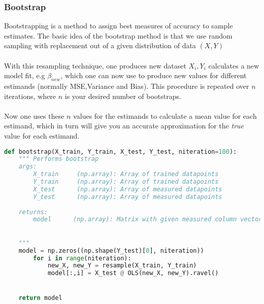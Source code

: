 \documentclass[../main.tex]{subfiles}
\begin{document}
\subsubsection{Bootstrap}\label{refmethod: bootstrap}
Bootstrapping is a method to assign best measures of accuracy to sample estimates. 
The basic idea of the bootstrap method is that we use random sampling with replacement out of a given distribution of data $(X,Y)$ %
\\ \\\indent With this resampling technique, one produces new dataset $X_i,Y_i$ calculates a new model fit, e.g $\beta_{new}$, which one can now use to produce new values for different estimands (normally MSE,Variance and Bias). This procedure is repeated over $n$  iterations, where $n$ is your desired number of bootstraps. \\ \\ Now one uses these $n$ values for the estimands to calculate a mean value for each estimand, which in turn will give you an accurate approximation for the \emph{true} value for each estimand.


\begin{lstlisting}[language=Python]
def bootstrap(X_train, Y_train, X_test, Y_test, niteration=100):
    """ Performs bootstrap
    args: 
        X_train     (np.array): Array of trained datapoints
        Y_train     (np.array): Array of trained datapoints
        X_test      (np.array): Array of measured datapoints
        Y_test      (np.array): Array of measured datapoints
    
    returns:
        model      (np.array): Matrix with given measured column vectors 
        

    """
    model = np.zeros((np.shape(Y_test)[0], niteration))
        for i in range(niteration):
            new_X, new_Y = resample(X_train, Y_train)
            model[:,i] = X_test @ OLS(new_X, new_Y).ravel()


    return model
\end{lstlisting}
\label{code:bootstrap}





\newpage
\end{document}
